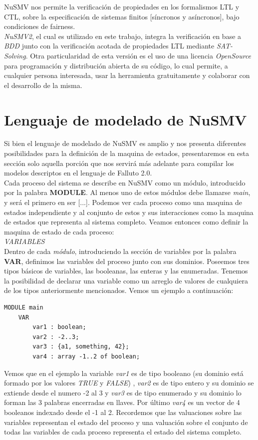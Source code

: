 \documentclass[titlepage, 12pt]{book}
\begin{document}
NuSMV nos permite la verificaci\'on de propiedades en los formalismos LTL y CTL, sobre la especificaci\'on de sistemas finitos [s\'incronos y as\'incronos], bajo condiciones de fairness.\\

\textit{NuSMV2}, el cual es utilizado en este trabajo, integra la verificaci\'on en base a \textit{BDD} junto con la verificaci\'on acotada de propiedades LTL mediante \textit{SAT-Solving}. Otra particularidad de esta versi\'on es el uso de una licencia \textit{OpenSource} para programaci\'on y distribuci\'on abierta de su c\'odigo, lo cual permite, a cualquier persona interesada, usar la herramienta gratuitamente y colaborar con el desarrollo de la misma.


\section{Lenguaje de modelado de NuSMV}
Si bien el lenguaje de modelado de NuSMV es amplio y nos presenta diferentes posibilidades para la definici\'on de la maquina de estados, presentaremos en esta secci\'on solo aquella porci\'on que nos servir\'a m\'as adelante para compilar los modelos descriptos en el lenguaje de Falluto 2.0.\\

Cada proceso del sistema se describe en NuSMV como un m\'odulo, introducido por la palabra \textbf{MODULE}. Al menos uno de estos m\'odulos debe llamarse \textit{main}, y ser\'a el primero en ser [...]. Podemos ver cada proceso como una maquina de estados independiente y al conjunto de estos y sus interacciones como la maquina de estados que representa al sistema completo. Veamos entonces como definir la maquina de estado de cada proceso:\\

\textit{VARIABLES}\\

Dentro de cada \textit{m\'odulo}, introduciendo la secci\'on de variables por la palabra \textbf{VAR}, definimos las variables del proceso junto con sus dominios. Poseemos tres tipos b\'asicos de variables, las booleanas, las enteras y las enumeradas. Tenemos la posibilidad de declarar una variable como un arreglo de valores de cualquiera de los tipos anteriormente mencionados. Vemos un ejemplo a continuaci\'on:
\begin{verbatim}
MODULE main
    VAR
        var1 : boolean;
        var2 : -2..3;
        var3 : {a1, something, 42};
        var4 : array -1..2 of boolean;
\end{verbatim}
Vemos que en el ejemplo la variable \textit{var1} es de tipo booleano (su dominio est\'a formado por los valores \textit{TRUE} y \textit{FALSE}) , \textit{var2} es de tipo entero y su dominio se extiende desde el numero -2 al 3 y \textit{var3} es de tipo enumerado y su dominio lo forman las 3 palabras encerradas en llaves. Por \'ultimo \textit{var4} es un vector de 4 booleanos indexado desde el -1 al 2. Recordemos que las valuaciones sobre las variables representan el estado del proceso y una valuaci\'on sobre el conjunto de todas las variables de cada proceso representa el estado del sistema completo.\\
\end{document}
